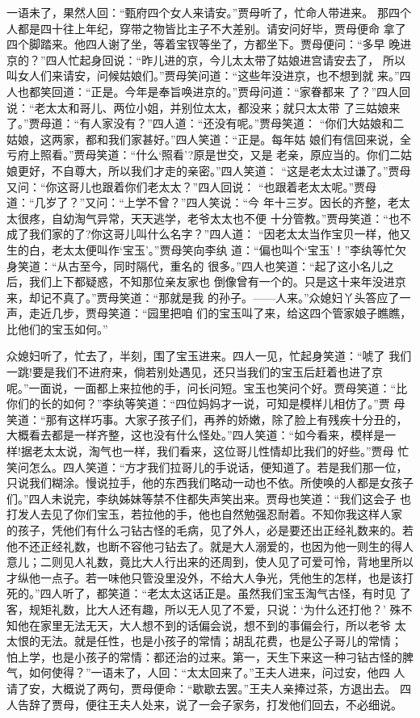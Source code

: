 一语未了，果然人回：“甄府四个女人来请安。”贾母听了，忙命人带进来。
那四个人都是四十往上年纪，穿带之物皆比主子不大差别。请安问好毕，贾母便命
拿了四个脚踏来。他四人谢了坐，等着宝钗等坐了，方都坐下。贾母便问：“多早
晚进京的？”四人忙起身回说：“昨儿进的京，今儿太太带了姑娘进宫请安去了，
所以叫女人们来请安，问候姑娘们。”贾母笑问道：“这些年没进京，也不想到就
来。”四人也都笑回道：“正是。今年是奉旨唤进京的。”贾母问道：“家眷都来
了？”四人回说：“老太太和哥儿、两位小姐，并别位太太，都没来；就只太太带
了三姑娘来了。”贾母道：“有人家没有？”四人道：“还没有呢。”贾母笑道：
“你们大姑娘和二姑娘，这两家，都和我们家甚好。”四人笑道：“正是。每年姑
娘们有信回来说，全亏府上照看。”贾母笑道：“什么‘照看’?原是世交，又是
老亲，原应当的。你们二姑娘更好，不自尊大，所以我们才走的亲密。”四人笑道：
“这是老太太过谦了。”贾母又问：“你这哥儿也跟着你们老太太？”四人回说：
“也跟着老太太呢。”贾母道：“几岁了？”又问：“上学不曾？”四人笑说：“今
年十三岁。因长的齐整，老太太很疼，自幼淘气异常，天天逃学，老爷太太也不便
十分管教。”贾母笑道：“也不成了我们家的了?你这哥儿叫什么名字？”四人道：
“因老太太当作宝贝一样，他又生的白，老太太便叫作‘宝玉’。”贾母笑向李纨
道：“偏也叫个‘宝玉’！”李纨等忙欠身笑道：“从古至今，同时隔代，重名的
很多。”四人也笑道：“起了这小名儿之后，我们上下都疑惑，不知那位亲友家也
倒像曾有一个的。只是这十来年没进京来，却记不真了。”贾母笑道：“那就是我
的孙子。——人来。”众媳妇丫头答应了一声，走近几步，贾母笑道：“园里把咱
们的宝玉叫了来，给这四个管家娘子瞧瞧，比他们的宝玉如何。”

众媳妇听了，忙去了，半刻，围了宝玉进来。四人一见，忙起身笑道：“唬了
我们一跳!要是我们不进府来，倘若别处遇见，还只当我们的宝玉后赶着也进了京
呢。”一面说，一面都上来拉他的手，问长问短。宝玉也笑问个好。贾母笑道：“比
你们的长的如何？”李纨等笑道：“四位妈妈才一说，可知是模样儿相仿了。”贾
母笑道：“那有这样巧事。大家子孩子们，再养的娇嫩，除了脸上有残疾十分丑的，
大概看去都是一样齐整，这也没有什么怪处。”四人笑道：“如今看来，模样是一
样!据老太太说，淘气也一样，我们看来，这位哥儿性情却比我们的好些。”贾母
忙笑问怎么。四人笑道：“方才我们拉哥儿的手说话，便知道了。若是我们那一位，
只说我们糊涂。慢说拉手，他的东西我们略动一动也不依。所使唤的人都是女孩子
们。”四人未说完，李纨姊妹等禁不住都失声笑出来。贾母也笑道：“我们这会子
也打发人去见了你们宝玉，若拉他的手，他也自然勉强忍耐着。不知你我这样人家
的孩子，凭他们有什么刁钻古怪的毛病，见了外人，必是要还出正经礼数来的。若
他不还正经礼数，也断不容他刁钻去了。就是大人溺爱的，也因为他一则生的得人
意儿；二则见人礼数，竟比大人行出来的还周到，使人见了可爱可怜，背地里所以
才纵他一点子。若一味他只管没里没外，不给大人争光，凭他生的怎样，也是该打
死的。”四人听了，都笑道：“老太太这话正是。虽然我们宝玉淘气古怪，有时见
了客，规矩礼数，比大人还有趣，所以无人见了不爱，只说：‘为什么还打他？’
殊不知他在家里无法无天，大人想不到的话偏会说，想不到的事偏会行，所以老爷
太太恨的无法。就是任性，也是小孩子的常情；胡乱花费，也是公子哥儿的常情；
怕上学，也是小孩子的常情：都还治的过来。第一，天生下来这一种刁钻古怪的脾
气，如何使得？”一语未了，人回：“太太回来了。”王夫人进来，问过安，他四
人请了安，大概说了两句，贾母便命：“歇歇去罢。”王夫人亲捧过茶，方退出去。
四人告辞了贾母，便往王夫人处来，说了一会子家务，打发他们回去，不必细说。


